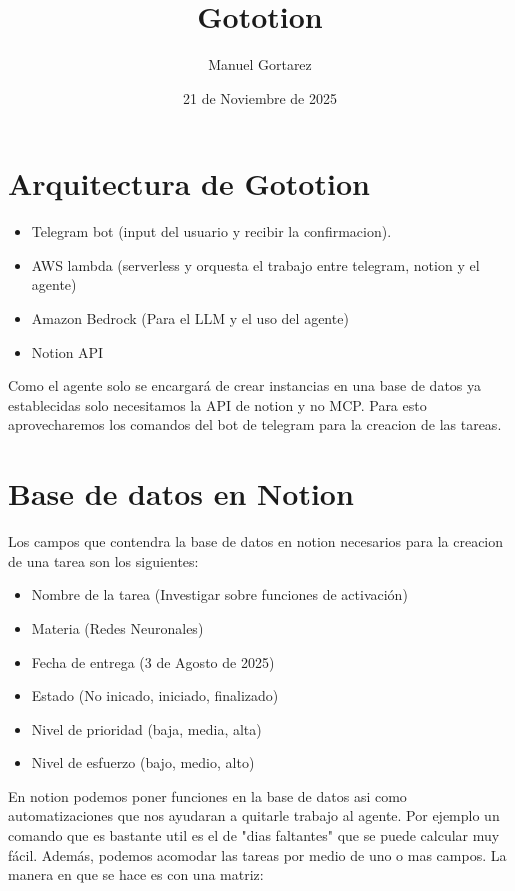 \documentclass[10pt]{article}
\author{Manuel Gortarez}
\date{21 de Noviembre de 2025}
\title{Gototion}
\begin{document}
\maketitle
\section*{Arquitectura de Gototion}
\label{sec:org3d6ddcd}

\begin{itemize}
\item Telegram bot (input del usuario y recibir la confirmacion).
\item AWS lambda (serverless y orquesta el trabajo entre telegram, notion y el agente)
\item Amazon Bedrock (Para el LLM y el uso del agente)
\item Notion API
\end{itemize}

Como el agente solo se encargará de crear instancias en una base de datos ya establecidas
solo necesitamos la API de notion y no MCP. Para esto aprovecharemos los comandos del bot
de telegram para la creacion de las tareas.
\section*{Base de datos en Notion}
\label{sec:orgd90748d}

Los campos que contendra la base de datos en notion necesarios para la creacion de una tarea
son los siguientes:
\begin{itemize}
\item Nombre de la tarea (Investigar sobre funciones de activación)
\item Materia (Redes Neuronales)
\item Fecha de entrega (3 de Agosto de 2025)
\item Estado (No inicado, iniciado, finalizado)
\item Nivel de prioridad (baja, media, alta)
\item Nivel de esfuerzo (bajo, medio, alto)
\end{itemize}

En notion podemos poner funciones en la base de datos asi como automatizaciones que nos ayudaran
a quitarle trabajo al agente. Por ejemplo un comando que es bastante util es el de "dias faltantes"
que se puede calcular muy fácil. Además, podemos acomodar las tareas por medio de uno o mas campos.
La manera en que se hace es con una matriz:
\end{document}
